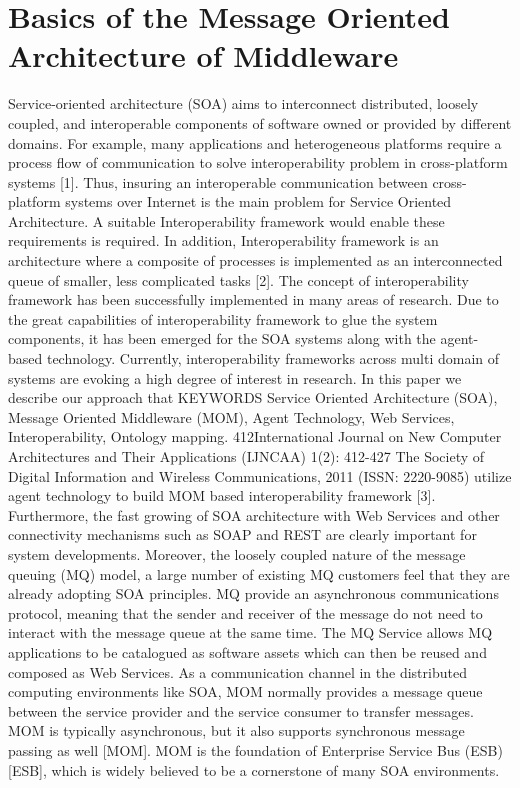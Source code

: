 \documentclass{SureshLimkar}
\begin{document}
\section{Basics of the Message Oriented Architecture of Middleware}
\hspace{0.5 in}Service-oriented architecture (SOA)
aims to interconnect distributed, loosely
coupled, and interoperable components
of software owned or provided by
different domains. For example, many
applications
and
heterogeneous
platforms require a process flow of
communication to solve interoperability
problem in cross-platform systems [1].
Thus,
insuring
an
interoperable
communication between cross-platform
systems over Internet is the main
problem
for
Service
Oriented
Architecture. A suitable Interoperability
framework
would
enable
these
requirements is required.
In
addition,
Interoperability
framework is an architecture where a
composite of processes is implemented
as an interconnected queue of smaller,
less complicated tasks [2]. The concept
of interoperability framework has been
successfully implemented in many areas
of research. Due to the great capabilities
of interoperability framework to glue the
system components, it has been emerged
for the SOA systems along with the
agent-based technology. Currently,
interoperability frameworks across multi
domain of systems are evoking a high
degree of interest in research. In this
paper we describe our approach that
KEYWORDS
Service Oriented Architecture (SOA),
Message Oriented Middleware (MOM),
Agent
Technology,
Web
Services,
Interoperability, Ontology mapping.
412International Journal on New Computer Architectures and Their Applications (IJNCAA) 1(2): 412-427
The Society of Digital Information and Wireless Communications, 2011 (ISSN: 2220-9085)
utilize agent technology to build MOM
based interoperability framework [3].
Furthermore, the fast growing of
SOA architecture with Web Services and
other connectivity mechanisms such as
SOAP and REST are clearly important
for system developments. Moreover, the
loosely coupled nature of the message
queuing (MQ) model, a large number of
existing MQ customers feel that they are
already adopting SOA principles. MQ
provide
an
asynchronous
communications protocol, meaning that
the sender and receiver of the message
do not need to interact with the message
queue at the same time. The MQ Service
allows MQ applications to be catalogued
as software assets which can then be
reused and composed as Web Services.
As a communication channel in the
distributed computing environments like
SOA, MOM normally provides a
message queue between the service
provider and the service consumer to
transfer messages. MOM is typically
asynchronous, but it also supports
synchronous message passing as well
[MOM]. MOM is the foundation of
Enterprise Service Bus (ESB) [ESB],
which is widely believed to be a
cornerstone of many SOA environments.
\end{document}
